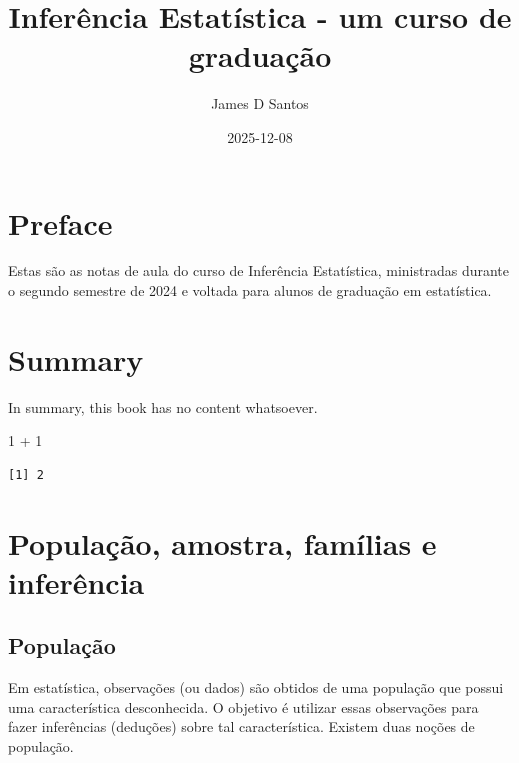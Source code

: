 \documentclass[
  letterpaper,
  DIV=11,
  numbers=noendperiod]{scrartcl}
\title{Inferência Estatística - um curso de graduação}
\author{James D Santos}
\date{2025-12-08}
\newenvironment{Shaded}{\begin{snugshade}}{\end{snugshade}}
\newcommand{\DecValTok}[1]{\textcolor[rgb]{0.68,0.00,0.00}{#1}}
\newcommand{\SpecialCharTok}[1]{\textcolor[rgb]{0.37,0.37,0.37}{#1}}
\renewcommand*\contentsname{Table of contents}
\newcommand\contentsname{Table of contents}
\begin{document}
\maketitle

\renewcommand*\contentsname{Table of contents}
{
\hypersetup{linkcolor=}
\setcounter{tocdepth}{2}
\tableofcontents
}

\chapter*{Preface}\label{preface}


Estas são as notas de aula do curso de Inferência Estatística,
ministradas durante o segundo semestre de 2024 e voltada para alunos de
graduação em estatística.


\chapter{Summary}\label{summary}

In summary, this book has no content whatsoever.

\begin{Shaded}
\begin{Highlighting}[]
\DecValTok{1} \SpecialCharTok{+} \DecValTok{1}
\end{Highlighting}
\end{Shaded}

\begin{verbatim}
[1] 2
\end{verbatim}


\chapter{População, amostra, famílias e
inferência}\label{populauxe7uxe3o-amostra-famuxedlias-e-inferuxeancia}

\section{População}\label{populauxe7uxe3o}

Em estatística, observações (ou dados) são obtidos de uma população que
possui uma característica desconhecida. O objetivo é utilizar essas
observações para fazer inferências (deduções) sobre tal característica.
Existem duas noções de população.
\end{document}
